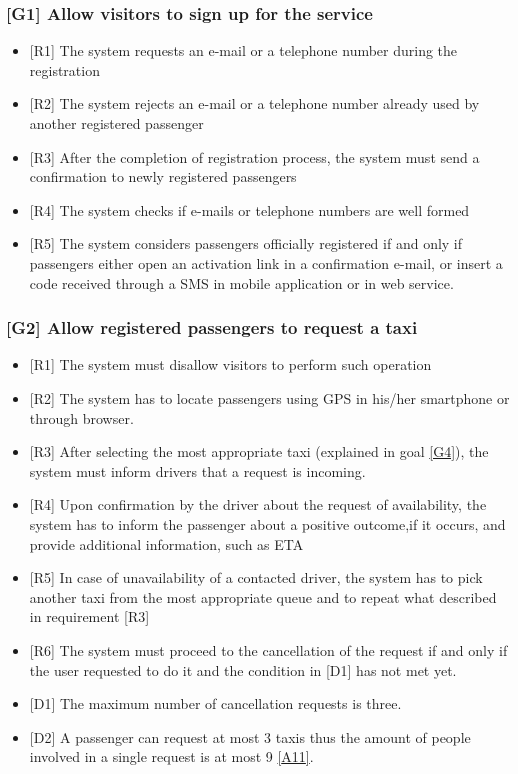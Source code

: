\documentclass[a4paper,12pt]{article}%
\begin{document}
\subsubsection{{[}G1{]} Allow visitors to sign up for the service}
\label{goal1}
\begin{itemize}
\item {[}R1{]} The system requests an e-mail or a telephone number during the registration
\item {[}R2{]} The system rejects an e-mail or a telephone number already used by another registered passenger
\item {[}R3{]} After the completion of registration process, the system must send a confirmation to newly registered passengers
\item {[}R4{]} The system checks if e-mails or telephone numbers are well formed
\item {[}R5{]} The system considers passengers officially registered if and only if passengers either open an activation link in a confirmation e-mail, or insert a code received through a SMS in mobile application or in web service.
\end{itemize}
\subsubsection{{[}G2{]} Allow registered passengers to request a taxi}
\label{goal2}
\begin{itemize}
\item {[}R1{]} The system must disallow visitors to perform such operation
\item {[}R2{]} The system has to locate passengers using GPS in his/her smartphone or through browser.
\item {[}R3{]} After selecting the most appropriate taxi (explained in goal \hyperref[goal4]{[G4]}), the system must inform drivers that a request is incoming.
\item {[}R4{]} Upon confirmation by the driver about the request of availability, the system has to inform the passenger about a positive outcome,if it occurs, and provide additional information, such as ETA
\item {[}R5{]} In case of unavailability of a contacted driver, the system has to pick another taxi from the most appropriate queue and to repeat what described in requirement [R3]
\item {[}R6{]} The system must proceed to the cancellation of the request if and only if the user requested to do it and the condition in [D1] has not met yet.
\item {[}D1{]} The maximum number of cancellation requests is three.
\item {[}D2{]} A passenger can request at most 3 taxis thus the amount of people involved in a single request is at most 9 \hyperref[a11]{{[}A11{]}}.
\end{itemize}
\end{document}
